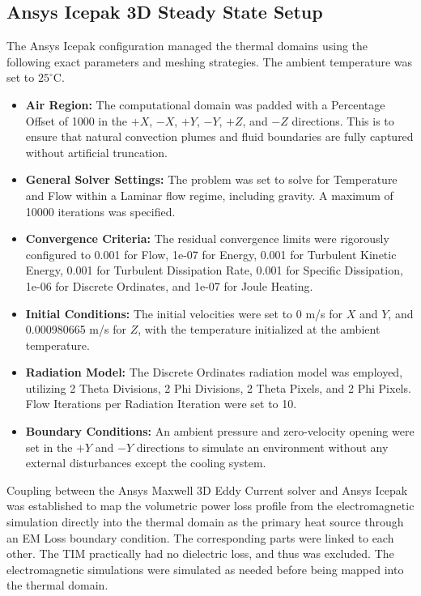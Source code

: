 \subsection*{Ansys Icepak 3D Steady State Setup}
The Ansys Icepak configuration managed the thermal domains using the following exact parameters and meshing strategies. The ambient temperature was set to $25^\circ$C.
\begin{itemize}
    \item \textbf{Air Region:} The computational domain was padded with a Percentage Offset of 1000 in the $+X$, $-X$, $+Y$, $-Y$, $+Z$, and $-Z$ directions. This is to ensure that natural convection plumes and fluid boundaries are fully captured without artificial truncation.
    \item \textbf{General Solver Settings:} The problem was set to solve for Temperature and Flow within a Laminar flow regime, including gravity. A maximum of 10000 iterations was specified.
    \item \textbf{Convergence Criteria:} The residual convergence limits were rigorously configured to 0.001 for Flow, 1e-07 for Energy, 0.001 for Turbulent Kinetic Energy, 0.001 for Turbulent Dissipation Rate, 0.001 for Specific Dissipation, 1e-06 for Discrete Ordinates, and 1e-07 for Joule Heating.
    \item \textbf{Initial Conditions:} The initial velocities were set to 0 m/s for $X$ and $Y$, and 0.000980665 m/s for $Z$, with the temperature initialized at the ambient temperature.
    \item \textbf{Radiation Model:} The Discrete Ordinates radiation model was employed, utilizing 2 Theta Divisions, 2 Phi Divisions, 2 Theta Pixels, and 2 Phi Pixels. Flow Iterations per Radiation Iteration were set to 10.
    \item \textbf{Boundary Conditions:} An ambient pressure and zero-velocity opening were set in the $+Y$ and $-Y$ directions to simulate an environment without any external disturbances except the cooling system.
\end{itemize}

Coupling between the Ansys Maxwell 3D Eddy Current solver and Ansys Icepak was established to map the volumetric power loss profile from the electromagnetic simulation directly into the thermal domain as the primary heat source through an EM Loss boundary condition. The corresponding parts were linked to each other. The TIM practically had no dielectric loss, and thus was excluded. The electromagnetic simulations were simulated as needed before being mapped into the thermal domain.
